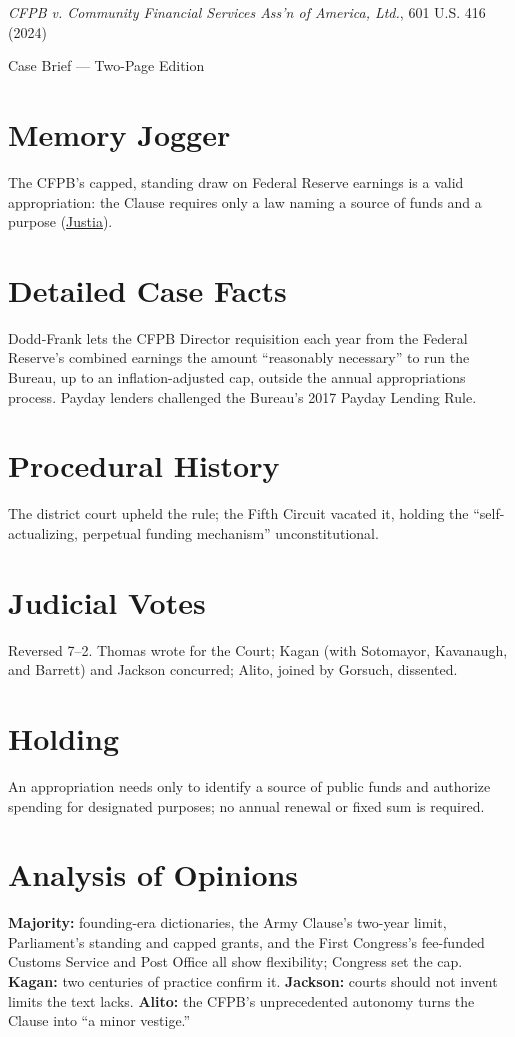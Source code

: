 \documentclass[12pt]{article}
\begin{document}
\begin{center}
{\LARGE \textit{CFPB v. Community Financial Services Ass'n of America, Ltd.}, 601 U.S. 416 (2024)\par}
\vspace{0.5em}
{\large Case Brief --- Two-Page Edition\par}
\end{center}

\section{Memory Jogger}
The CFPB's capped, standing draw on Federal Reserve earnings is a valid appropriation: the Clause requires only a law naming a source of funds and a purpose (\href{https://supreme.justia.com/cases/federal/us/601/22-448/}{Justia}).

\section{Detailed Case Facts}
Dodd-Frank lets the CFPB Director requisition each year from the Federal Reserve's combined earnings the amount ``reasonably necessary'' to run the Bureau, up to an inflation-adjusted cap, outside the annual appropriations process. Payday lenders challenged the Bureau's 2017 Payday Lending Rule.

\section{Procedural History}
The district court upheld the rule; the Fifth Circuit vacated it, holding the ``self-actualizing, perpetual funding mechanism'' unconstitutional.

\section{Judicial Votes}
Reversed 7--2. Thomas wrote for the Court; Kagan (with Sotomayor, Kavanaugh, and Barrett) and Jackson concurred; Alito, joined by Gorsuch, dissented.

\section{Holding}
An appropriation needs only to identify a source of public funds and authorize spending for designated purposes; no annual renewal or fixed sum is required.

\section{Analysis of Opinions}
\textbf{Majority:} founding-era dictionaries, the Army Clause's two-year limit, Parliament's standing and capped grants, and the First Congress's fee-funded Customs Service and Post Office all show flexibility; Congress set the cap. \textbf{Kagan:} two centuries of practice confirm it. \textbf{Jackson:} courts should not invent limits the text lacks. \textbf{Alito:} the CFPB's unprecedented autonomy turns the Clause into ``a minor vestige.''
\end{document}
